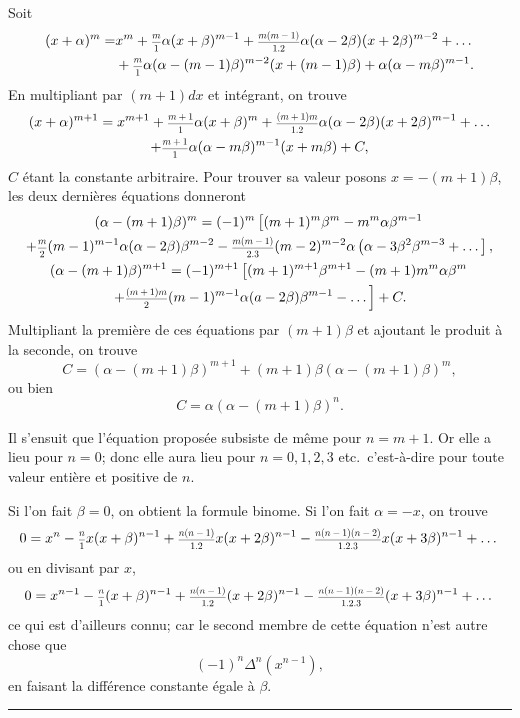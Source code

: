 \documentclass[oneside, 12 pt, leqno]{memoir}
\let\oldfrac\frac
\def\frac#1#2{\mathchoice{\text{\scalebox{.83}{${\oldfrac{#1}{#2}}$}}}{\text{\scalebox{.83}{${\displaystyle\oldfrac{#1}{#2}}$}}}{\genfrac{}{}{}{2}{#1}{#2}}{\genfrac{}{}{}{3}{#1}{#2}}}
\begin{document}
Soit
\[\begin{aligned}
(x+\alpha)^m=&x^m+\frac{m}{1} \alpha(x+\beta)^{m-1}+\frac{m(m-1)}{1.2} \alpha(\alpha-2 \beta)(x+2 \beta)^{m-2}+\dots \\
&+\frac{m}{1} \alpha(\alpha-(m-1) \beta)^{m-2}(x+(m-1) \beta)+\alpha(\alpha-m \beta)^{m-1}.
\end{aligned}\]
En multipliant par \((m+1) d x\) et intégrant, on trouve \clearpage\noindent%
\[\begin{gathered}
(x+\alpha)^{m+1}=x^{m+1}+\frac{m+1}{1} \alpha(x+\beta)^m+\frac{(m+1) m}{1.2} \alpha(\alpha-2 \beta)(x+2 \beta)^{m-1}+\dots \\
+\frac{m+1}{1} \alpha(\alpha-m \beta)^{m-1}(x+m \beta)+C,
\end{gathered}\]
\(C\) étant la constante arbitraire. Pour trouver sa valeur posons \(x=-(m+1) {\beta}\), les deux dernières équations donneront
\[\begin{gathered}
(\alpha-(m+1) \beta)^m=(-1)^m\left[(m+1)^m \beta^m-m^m \alpha \beta^{m-1}\right. \\
+\frac{m}{2}(m-1)^{m-1} \alpha(\alpha-2 \beta) \beta^{m-2}-\frac{m(m-1)}{2.3}(m-2)^{m-2} \alpha\left(\alpha-3 \beta^2 \beta^{m-3}+\dots\right], \\
(\alpha-(m+1) \beta)^{m+1}=(-1)^{m+1}\left[(m+1)^{m+1} \beta^{m+1}-(m+1) m^m \alpha \beta^m\right. \\
\left.+\frac{(m+1) m}{2}(m-1)^{m-1} \alpha(a-2 \beta) \beta^{m-1}-\dots\right]+C.
\end{gathered}\]
Multipliant la première de ces équations par \((m+1) {\beta}\) et ajoutant le produit à la seconde, on trouve
\[C=(\alpha-(m+1) \beta)^{m+1}+(m+1) \beta(\alpha-(m+1) \beta)^m,\]
ou bien
\[C=\alpha(\alpha-(m+1) \beta)^n.\]

Il s'ensuit que l'équation proposée subsiste de même pour \(n=m+1\). Or elle a lieu pour \(n=0\); donc elle aura lieu pour \(n=0,1,2,3\) etc.\ c'est-à-dire pour toute valeur entière et positive de \(n\).

Si l'on fait \(\beta=0\), on obtient la formule binome. Si l'on fait \(\alpha=-x\), on trouve
\[0=x^n-\frac{n}{1} x(x+\beta)^{n-1} +\frac{n(n-1)}{1.2} x(x+2 \beta)^{n-1} -\frac{n(n-1)(n-2)}{1.2.3} x(x+3 \beta)^{n-1}+\dots\]
ou en divisant par \(x\),
\[0=x^{n-1}-\frac{n}{1}(x+\beta)^{n-1} +\frac{n(n-1)}{1.2}(x+2 \beta)^{n-1} -\frac{n(n-1)(n-2)}{1.2.3}(x+3 \beta)^{n-1}+\dots\]
ce qui est d'ailleurs connu; car le second membre de cette équation n'est autre chose que
\[(-1)^n \Delta^n\left(x^{n-1}\right),\]
en faisant la différence constante égale à \({\beta}\).
\begin{center}
\rule{2in}{0.1pt}
\end{center}
\vfill
\end{document}
